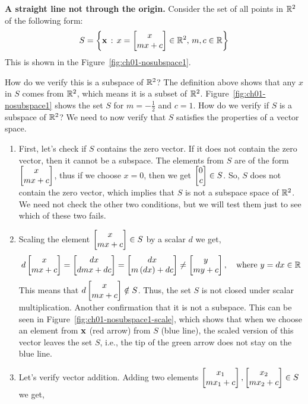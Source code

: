 \begin{boxedstuff}
\begin{example}
    \textbf{A straight line not through the origin.} Consider the set of all points in $\mathbb{R}^2$ of the following form:
    \[ S = \lc \mf{x} \, : \, x = \bmxc x \\ m x + c \emx \in \mb{R}^2, \, m, c \in \mb{R} \rc \]
    This is shown in the Figure~\ref{fig:ch01-nosubspace1}.

    How do we verify this is a subspace of $\mathbb{R}^2$? The definition above shows that any $x$ in $S$ comes from $\mathbb{R}^2$, which means it is a subset of $\mathbb{R}^2$. Figure~\ref{fig:ch01-nosubspace1} shows the set $S$ for $m = -\frac{1}{2}$ and $c = 1$.
    \noindent How do we verify if $S$ is a subspace of $\mathbb{R}^2$? We need to now verify that $S$ satisfies the properties of a vector space.
    \begin{enumerate}
        \item First, let's check if $S$ contains the zero vector. If it does not contain the zero vector, then it cannot be a subspace. The elements from $S$ are of the form $\bmxc x \\ m x + c\emx$, thus if we choose $x = 0$, then we get $\bmx 0 \\ c \emx \in S$. So, $S$ does not contain the zero vector, which implies that $S$ is not a subspace space of $\mathbb{R}^2$. We need not check the other two conditions, but we will test them just to see which of these two fails.
        \item Scaling the element $\bmxc x \\ m x + c \emx \in S$ by a scalar $d$ we get,
        \[ d \bmxc x \\ m x + c\emx = \bmxc d x \\ d m x + d c \emx = \bmxc d x \\ m \pp{d x} + dc \emx \neq \bmxc y \\ m y + c\emx, \quad \text{where} \,\, y = d x \in \mb{R} \]
        This means that $d \bmxc x \\ m x + c\emx \notin S$. Thus, the set $S$ is not closed under scalar multiplication. Another confirmation that it is not a subspace. This can be seen in Figure~\ref{fig:ch01-nosubspace1-scale}, which shows that when we choose an element from $\mathbf{x}$ (red arrow) from $S$ (blue line), the scaled version of this vector leaves the set $S$, i.e., the tip of the green arrow does not stay on the blue line.
        \item Let's verify vector addition. Adding two elements $\bmxc x_1 \\ m x_1 + c\emx, \bmxc x_2 \\ m x_2 + c\emx \in S$ we get,

\end{enumerate}
\end{example}
\end{boxedstuff}
